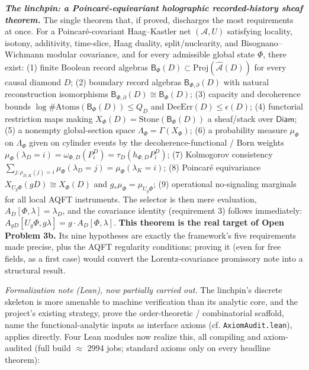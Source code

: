 \documentclass[11pt,a4paper]{article}
\begin{document}
\emph{\textbf{The linchpin: a Poincaré-equivariant holographic recorded-history sheaf theorem.}} The single theorem that, if proved, discharges the most requirements at once. For a Poincaré-covariant Haag–Kastler net $(\mathcal A, U)$ satisfying locality, isotony, additivity, time-slice, Haag duality, split/nuclearity, and Bisognano–Wichmann modular covariance, and for every admissible global state $\Phi$, there exist: (1) finite Boolean record algebras $\mathsf{B}_\Phi(D) \subset \mathrm{Proj}(\widehat{\mathcal A}(D))$ for every causal diamond $D$; (2) boundary record algebras $\mathsf{B}_{\Phi,\partial}(D)$ with natural reconstruction isomorphisms $\mathsf{B}_{\Phi,\partial}(D) \cong \mathsf{B}_\Phi(D)$; (3) capacity and decoherence bounds $\log\#\mathrm{Atoms}(\mathsf{B}_\Phi(D)) \le Q_D$ and $\mathrm{DecErr}(D) \le \epsilon(D)$; (4) functorial restriction maps making $X_\Phi(D) = \mathrm{Stone}(\mathsf{B}_\Phi(D))$ a sheaf/stack over $\mathsf{Diam}$; (5) a nonempty global-section space $\Lambda_\Phi = \Gamma(X_\Phi)$; (6) a probability measure $\mu_\Phi$ on $\Lambda_\Phi$ given on cylinder events by the decoherence-functional / Born weights $\mu_\Phi(\lambda_D = i) = \omega_{\Phi,D}(P_i^D) = \tau_D(h_{\Phi,D}P_i^D)$; (7) Kolmogorov consistency $\sum_{j : \rho_{D,K}(j)=i} \mu_\Phi(\lambda_D = j) = \mu_\Phi(\lambda_K = i)$; (8) Poincaré equivariance $X_{U_g\Phi}(gD) \cong X_\Phi(D)$ and $g_*\mu_\Phi = \mu_{U_g\Phi}$; (9) operational no-signaling marginals for all local AQFT instruments. The selector is then mere evaluation, $A_D[\Phi,\lambda] = \lambda_D$, and the covariance identity (requirement 3) follows immediately: $A_{gD}[U_g\Phi, g\lambda] = g\cdot A_D[\Phi,\lambda]$. \textbf{This theorem is the real target of Open Problem 3b.} Its nine hypotheses are exactly the framework's five requirements made precise, plus the AQFT regularity conditions; proving it (even for free fields, as a first case) would convert the Lorentz-covariance promissory note into a structural result.

\emph{Formalization note (Lean), now partially carried out.} The linchpin's discrete skeleton is more amenable to machine verification than its analytic core, and the project's existing strategy, prove the order-theoretic / combinatorial scaffold, name the functional-analytic inputs as interface axioms (cf. \texttt{AxiomAudit.lean}), applies directly. Four Lean modules now realize this, all compiling and axiom-audited (full build $\approx$ 2994 jobs; standard axioms only on every headline theorem):
\end{document}
